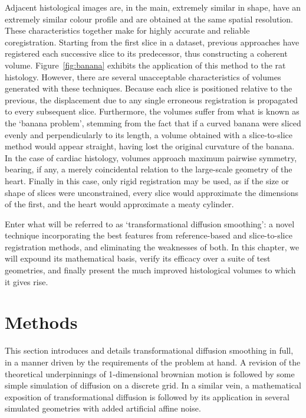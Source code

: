   Adjacent histological images are, in the main, extremely similar in shape, have an extremely similar colour profile and are obtained at the same spatial resolution. These characteristics together make for highly accurate and reliable coregistration. Starting from the first slice in a dataset, previous approaches have registered each successive slice to its predecessor, thus constructing a coherent volume. Figure~\ref{fig:banana} exhibits the application of this method to the rat histology. However, there are several unacceptable characteristics of volumes generated with these techniques. Because each slice is positioned relative to the previous, the displacement due to any single erroneous registration is propagated to every subsequent slice. Furthermore, the volumes suffer from what is known as the `banana problem', stemming from the fact that if a curved banana were sliced evenly and perpendicularly to its length, a volume obtained with a slice-to-slice method would appear straight, having lost the original curvature of the banana. In the case of cardiac histology, volumes approach maximum pairwise symmetry, bearing, if any, a merely coincidental relation to the large-scale geometry of the heart. Finally in this case, only rigid registration may be used, as if the size or shape of slices were unconstrained, every slice would approximate the dimensions of the first, and the heart would approximate a meaty cylinder.
  
  Enter what will be referred to as `transformational diffusion smoothing': a novel technique incorporating the best features from reference-based and slice-to-slice registration methods, and eliminating the weaknesses of both. In this chapter, we will expound its mathematical basis, verify its efficacy over a suite of test geometries, and finally present the much improved histological volumes to which it gives rise.
    

\section{Methods} %
\label{sec:methods}
  This section introduces and details transformational diffusion smoothing in full, in a manner driven by the requirements of the problem at hand. A revision of the theoretical underpinnings of 1-dimensional brownian motion is followed by some simple simulation of diffusion on a discrete grid. In a similar vein, a mathematical exposition of transformational diffusion is followed by its application in several simulated geometries with added artificial affine noise.
  
